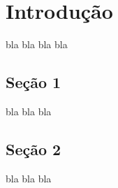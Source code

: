 \chapter{Introdução}
bla bla bla bla 

\section{Seção 1}
    bla bla bla

\section{Seção 2}
    bla bla bla